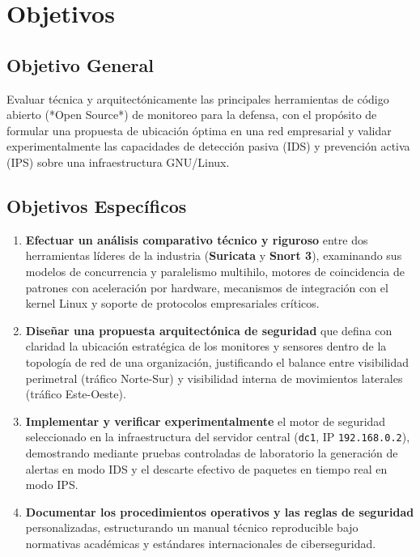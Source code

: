 
\section{Objetivos}

\subsection{Objetivo General}

Evaluar técnica y arquitectónicamente las principales herramientas de código abierto (*Open Source*) de monitoreo para la defensa, con el propósito de formular una propuesta de ubicación óptima en una red empresarial y validar experimentalmente las capacidades de detección pasiva (IDS) y prevención activa (IPS) sobre una infraestructura GNU/Linux.

\subsection{Objetivos Específicos}

\begin{enumerate}
  \item \textbf{Efectuar un análisis comparativo técnico y riguroso} entre dos herramientas líderes de la industria (\textbf{Suricata} y \textbf{Snort 3}), examinando sus modelos de concurrencia y paralelismo multihilo, motores de coincidencia de patrones con aceleración por hardware, mecanismos de integración con el kernel Linux y soporte de protocolos empresariales críticos.
  \item \textbf{Diseñar una propuesta arquitectónica de seguridad} que defina con claridad la ubicación estratégica de los monitores y sensores dentro de la topología de red de una organización, justificando el balance entre visibilidad perimetral (tráfico Norte-Sur) y visibilidad interna de movimientos laterales (tráfico Este-Oeste).
  \item \textbf{Implementar y verificar experimentalmente} el motor de seguridad seleccionado en la infraestructura del servidor central (\texttt{dc1}, IP \texttt{192.168.0.2}), demostrando mediante pruebas controladas de laboratorio la generación de alertas en modo IDS y el descarte efectivo de paquetes en tiempo real en modo IPS.
  \item \textbf{Documentar los procedimientos operativos y las reglas de seguridad} personalizadas, estructurando un manual técnico reproducible bajo normativas académicas y estándares internacionales de ciberseguridad.
\end{enumerate}
